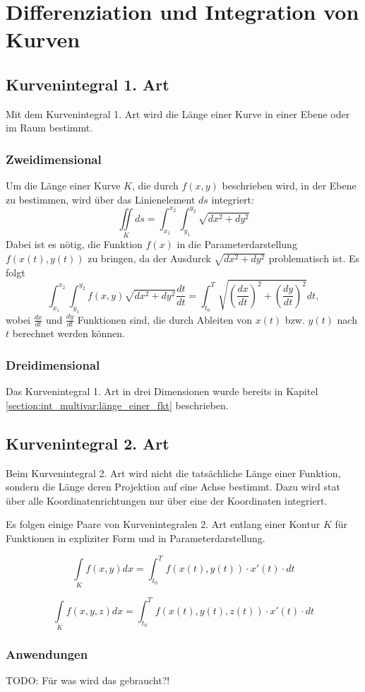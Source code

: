 \section{Differenziation und Integration von Kurven}
\subsection{Kurvenintegral 1. Art}
Mit dem Kurvenintegral 1. Art wird die Länge einer Kurve in einer Ebene oder im Raum bestimmt.

\subsubsection{Zweidimensional}
Um die Länge einer Kurve $K$, die durch $f(x, y)$ beschrieben wird, in der Ebene zu bestimmen, wird über das Linienelement $ds$ integriert:
\[
    \iint\limits_{K} ds = \int_{x_1}^{x_2} \int_{y_1}^{y_2} \sqrt{dx^2 + dy^2}
\]
Dabei ist es nötig, die Funktion $f(x)$ in die Parameterdarstellung $f(x(t), y(t))$ zu bringen, da der Ausdurck $\sqrt{dx^2 + dy^2}$ problematisch ist.
Es folgt
\[
    \int_{x_1}^{x_2} \int_{y_1}^{y_2} f(x, y) \sqrt{dx^2 + dy^2} \frac{dt}{dt} = \int_{t_0}^{T} \sqrt{(\frac{dx}{dt})^2 + (\frac{dy}{dt})^2} dt,
\]
wobei $\frac{dx}{dt}$ und $\frac{dy}{dt}$ Funktionen sind, die durch Ableiten von $x(t)$ bzw. $y(t)$ nach $t$ berechnet werden können.

\subsubsection{Dreidimensional}
Das Kurvenintegral 1. Art in drei Dimensionen wurde bereits in Kapitel \ref{section:int_multivar:länge_einer_fkt} beschrieben.

\subsection{Kurvenintegral 2. Art}
Beim Kurvenintegral 2. Art wird nicht die tatsächliche Länge einer Funktion, sondern die Länge deren Projektion auf eine Achse bestimmt.
Dazu wird stat über alle Koordinatenrichtungen nur über eine der Koordinaten integriert.

Es folgen einige Paare von Kurvenintegralen 2. Art entlang einer Kontur $K$ für Funktionen in expliziter Form und in Parameterdarstellung.

\[
    \int\limits_{K}f(x, y)dx = \int_{t_0}^{T}f(x(t), y(t)) \cdot x'(t) \cdot dt
\]

\[
    \int\limits_{K}f(x, y, z)dx = \int_{t_0}^{T}f(x(t), y(t), z(t)) \cdot x'(t) \cdot dt
\]

\subsubsection{Anwendungen}
TODO: Für was wird das gebraucht?!
